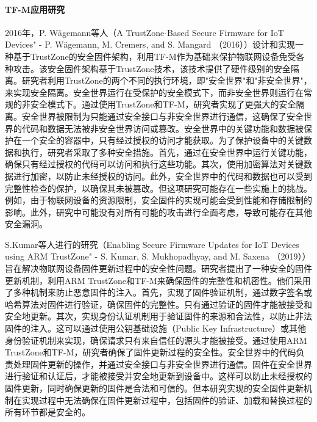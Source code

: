 \documentclass[12pt,a4paper]{ctexart}
\begin{document}
\paragraph{TF-M应用研究}
\par 2016年，P. Wägemann等人（A TrustZone-Based Secure Firmware for IoT Devices" - P. Wägemann, M. Cremers, and S. Mangard （2016））设计和实现一种基于TrustZone的安全固件架构，利用TF-M作为基础来保护物联网设备免受各种攻击。该安全固件架构基于TrustZone技术，该技术提供了硬件级别的安全隔离。研究者利用TrustZone的两个不同的执行环境，即"安全世界"和"非安全世界"，来实现安全隔离。安全世界运行在受保护的安全模式下，而非安全世界则运行在常规的非安全模式下。通过使用TrustZone和TF-M，研究者实现了更强大的安全隔离。安全世界被限制为只能通过安全接口与非安全世界进行通信，这确保了安全世界的代码和数据无法被非安全世界访问或篡改。安全世界中的关键功能和数据被保护在一个安全的容器中，只有经过授权的访问才能获取。为了保护设备中的关键数据和执行，研究者采取了多种安全措施。首先，通过在安全世界中运行关键功能，确保只有经过授权的代码可以访问和执行这些功能。其次，使用加密算法对关键数据进行加密，以防止未经授权的访问。此外，安全世界中的代码和数据也可以受到完整性检查的保护，以确保其未被篡改。但这项研究可能存在一些实施上的挑战。例如，由于物联网设备的资源限制，安全固件的实现可能会受到性能和存储限制的影响。此外，研究中可能没有对所有可能的攻击进行全面考虑，导致可能存在其他安全漏洞。
\par S.Kumar等人进行的研究（Enabling Secure Firmware Updates for IoT Devices using ARM TrustZone" - S. Kumar, S. Mukhopadhyay, and M. Saxena （2019））旨在解决物联网设备固件更新过程中的安全性问题。研究者提出了一种安全的固件更新机制，利用ARM TrustZone和TF-M来确保固件的完整性和机密性。他们采用了多种机制来防止恶意固件的注入。首先，实现了固件验证机制，通过数字签名或哈希算法对固件进行验证，确保固件的完整性。只有通过验证的固件才能被接受和安全地更新。其次，实现身份认证机制用于验证固件的来源和合法性，以防止非法固件的注入。这可以通过使用公钥基础设施（Public Key Infrastructure）或其他身份验证机制来实现，确保请求只有来自信任的源头才能被接受。通过使用ARM TrustZone和TF-M，研究者确保了固件更新过程的安全性。安全世界中的代码负责处理固件更新的操作，并通过安全接口与非安全世界进行通信。固件在安全世界进行验证和认证后，才能被接受并安全地更新到设备中。这样可以防止未经授权的固件更新，同时确保更新的固件是合法和可信的。但本研究实现的安全固件更新机制在实现过程中无法确保在固件更新过程中，包括固件的验证、加载和替换过程的所有环节都是安全的。
\end{document}
